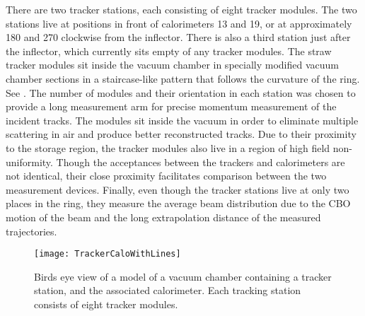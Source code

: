 There are two tracker stations, each consisting of eight tracker modules. The two stations live at positions in front of calorimeters 13 and 19, or at approximately 180\textdegree{} and 270\textdegree{} clockwise from the inflector. There is also a third station just after the inflector, which currently sits empty of any tracker modules. The straw tracker modules sit inside the vacuum chamber in specially modified vacuum chamber sections in a staircase-like pattern that follows the curvature of the ring. See . The number of modules and their orientation in each station was chosen to provide a long measurement arm for precise momentum measurement of the incident tracks. The modules sit inside the vacuum in order to eliminate multiple scattering in air and produce better reconstructed tracks. Due to their proximity to the storage region, the tracker modules also live in a region of high field non-uniformity. Though the acceptances between the trackers and calorimeters are not identical, their close proximity facilitates comparison between the two measurement devices. Finally, even though the tracker stations live at only two places in the ring, they measure the average beam distribution due to the CBO motion of the beam and the long extrapolation distance of the measured trajectories.


\begin{figure}[]
    \centering
    \texttt{[image: TrackerCaloWithLines]}
    \caption[TrackerCaloWithLines]{Birds eye view of a model of a vacuum chamber containing a tracker station, and the associated calorimeter. Each tracking station consists of eight tracker modules.}
    \label{fig:TrackerCaloWithLines}
\end{figure}





